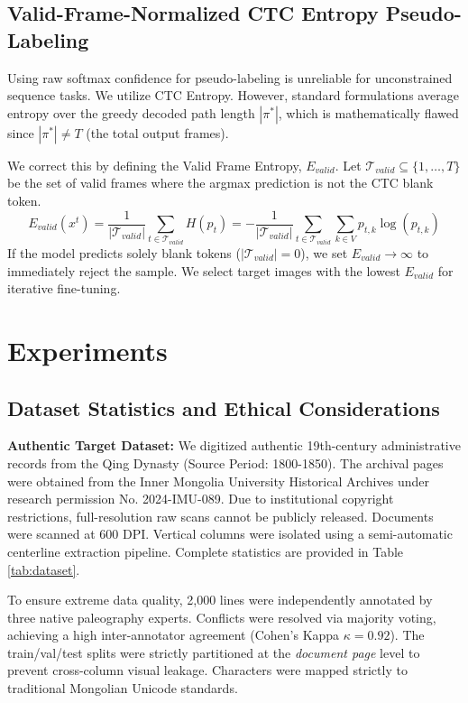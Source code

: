 \documentclass[11pt]{article}
\begin{document}
\subsection{Valid-Frame-Normalized CTC Entropy Pseudo-Labeling}
Using raw softmax confidence for pseudo-labeling is unreliable for unconstrained sequence tasks. We utilize CTC Entropy. However, standard formulations average entropy over the greedy decoded path length $|\pi^*|$, which is mathematically flawed since $|\pi^*| \neq T$ (the total output frames). 

We correct this by defining the Valid Frame Entropy, $E_{valid}$. Let $\mathcal{T}_{valid} \subseteq \{1, \dots, T\}$ be the set of valid frames where the argmax prediction is not the CTC blank token.
\begin{equation}
    E_{valid}(x^t) = \frac{1}{|\mathcal{T}_{valid}|} \sum_{t \in \mathcal{T}_{valid}} H(p_{t}) = -\frac{1}{|\mathcal{T}_{valid}|} \sum_{t \in \mathcal{T}_{valid}} \sum_{k \in V} p_{t,k} \log(p_{t,k})
\end{equation}
If the model predicts solely blank tokens ($|\mathcal{T}_{valid}|=0$), we set $E_{valid} \rightarrow \infty$ to immediately reject the sample. We select target images with the lowest $E_{valid}$ for iterative fine-tuning.

\section{Experiments}

\subsection{Dataset Statistics and Ethical Considerations}
\textbf{Authentic Target Dataset:} We digitized authentic 19th-century administrative records from the Qing Dynasty (Source Period: 1800-1850). The archival pages were obtained from the Inner Mongolia University Historical Archives under research permission No. 2024-IMU-089. Due to institutional copyright restrictions, full-resolution raw scans cannot be publicly released. Documents were scanned at 600 DPI. Vertical columns were isolated using a semi-automatic centerline extraction pipeline. Complete statistics are provided in Table \ref{tab:dataset}.

To ensure extreme data quality, 2,000 lines were independently annotated by three native paleography experts. Conflicts were resolved via majority voting, achieving a high inter-annotator agreement (Cohen's Kappa $\kappa = 0.92$). The train/val/test splits were strictly partitioned at the \textit{document page} level to prevent cross-column visual leakage. Characters were mapped strictly to traditional Mongolian Unicode standards.
\end{document}
